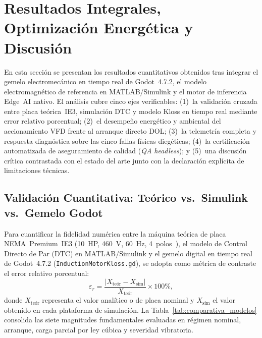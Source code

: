 \section{Resultados Integrales, Optimización Energética y Discusión}\label{sec:resultados}

En esta sección se presentan los resultados cuantitativos obtenidos tras integrar el gemelo electromecánico en tiempo real de Godot~4.7.2, el modelo electromagnético de referencia en MATLAB/Simulink y el motor de inferencia Edge~AI nativo. El análisis cubre cinco ejes verificables: (1)~la validación cruzada entre placa teórica~IE3, simulación DTC y modelo Kloss en tiempo real mediante error relativo porcentual; (2)~el desempeño energético y ambiental del accionamiento VFD frente al arranque directo DOL; (3)~la telemetría completa y respuesta diagnóstica sobre las cinco fallas físicas diegéticas; (4)~la certificación automatizada de aseguramiento de calidad (\emph{QA headless}); y (5)~una discusión crítica contrastada con el estado del arte junto con la declaración explícita de limitaciones técnicas.

\subsection{Validación Cuantitativa: Teórico vs.\ Simulink vs.\ Gemelo Godot}

Para cuantificar la fidelidad numérica entre la máquina teórica de placa NEMA~Premium~IE3 (\qty{10}{HP}, \qty{460}{\volt}, \qty{60}{\hertz}, 4~polos~\cite{WEG2024,IEC60034}), el modelo de Control Directo de Par (DTC) en MATLAB/Simulink y el gemelo digital en tiempo real de Godot~4.7.2 (\texttt{InductionMotorKloss.gd}), se adopta como métrica de contraste el error relativo porcentual:
\begin{equation}
\varepsilon_r = \frac{|X_{\text{teór}} - X_{\text{sim}}|}{X_{\text{teór}}} \times 100\%,
\label{eq:error_relativo}
\end{equation}
donde $X_{\text{teór}}$ representa el valor analítico o de placa nominal y $X_{\text{sim}}$ el valor obtenido en cada plataforma de simulación. La Tabla~\ref{tab:comparativa_modelos} consolida las siete magnitudes fundamentales evaluadas en régimen nominal, arranque, carga parcial por ley cúbica y severidad vibratoria.


